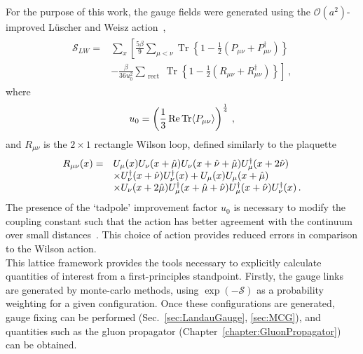 For the purpose of this work, the gauge fields were generated using the $\mathcal{O}(a^2)$-improved L\"uscher and Weisz action~\cite{Luscher:1984xn}, 
%
\begin{align}
\begin{aligned} \mathcal{S} _ { LW } = &\sum_x \left[ \frac { 5 \beta } { 9 } \sum _ { \mu < \nu } \operatorname { Tr } \left\{ 1 - \frac { 1 } { 2 } \left( P _ { \mu \nu } + P _ { \mu \nu } ^ { \dagger } \right) \right\}\right. \\
& \left.- \frac { \beta } { 36 u _ { 0 } ^ { 2 } } \sum _ { \text { rect } } \operatorname { Tr } \left\{ 1 - \frac { 1 } { 2 } \left( R _ { \mu \nu } + R _ { \mu \nu } ^ { \dagger } \right) \right\}\right]\, , \end{aligned}
\end{align}
%
where
\begin{equation}
u_0 = \left(\frac{1}{3}\operatorname{ Re } \operatorname{Tr}\langle P_{\mu\nu} \rangle\right)^{\frac{1}{4}}\, ,
\end{equation}
and $R_{\mu\nu}$ is the $2\times 1$ rectangle Wilson loop, defined similarly to the plaquette 
\begin{align}
\begin{array} { r l } { R _ { \mu \nu } ( x ) = } & { U _ { \mu } ( x ) U _ { \nu } ( x + \hat { \mu } ) U _ { \nu } ( x + \hat { \nu } + \hat { \mu } ) U _ { \mu } ^ { \dagger } ( x + 2 \hat { \nu } ) } \\ { } & { \times U _ { \nu } ^ { \dagger } ( x + \hat { \nu } ) U _ { \nu } ^ { \dagger } ( x ) + U _ { \mu } ( x ) U _ { \mu } ( x + \hat { \mu } ) } \\ { } & { \times U _ { \nu } ( x + 2 \hat { \mu } ) U _ { \mu } ^ { \dagger } ( x + \hat { \mu } + \hat { \nu } ) U _ { \mu } ^ { \dagger } ( x + \hat { \nu } ) U _ { \nu } ^ { \dagger } ( x ) }\, . \end{array}
\end{align}
The presence of the `tadpole' improvement factor $u_0$ is necessary to modify the coupling constant such that the action has better agreement with the continuum over small distances~\cite{Lepage:1992xa}. This choice of action provides reduced errors in comparison to the Wilson action.\\

This lattice framework provides the tools necessary to explicitly calculate quantities of interest from a first-principles standpoint. Firstly, the gauge links are generated by monte-carlo methods, using $\exp\left(-\mathcal{S}\right)$ as a probability weighting for a given configuration. Once these configurations are generated, gauge fixing can be performed (Sec.~\ref{sec:LandauGauge}, \ref{sec:MCG}), and quantities such as the gluon propagator (Chapter~\ref{chapter:GluonPropagator}) can be obtained.

